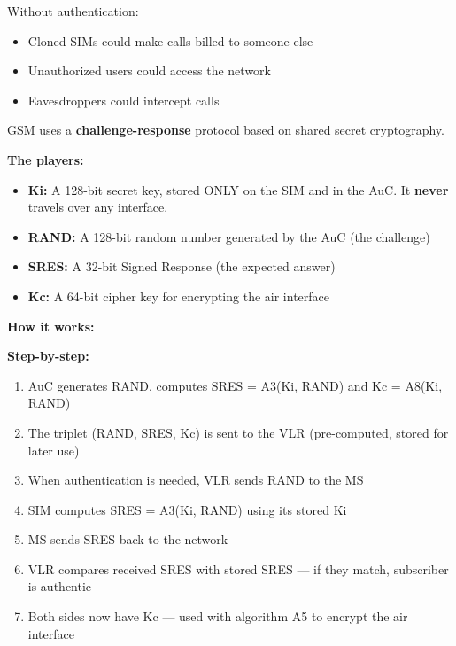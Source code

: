 Without authentication:

\begin{itemize}
\tightlist
\item
  Cloned SIMs could make calls billed to someone else
\item
  Unauthorized users could access the network
\item
  Eavesdroppers could intercept calls
\end{itemize}


GSM uses a \textbf{challenge-response} protocol based on shared secret cryptography.

\textbf{The players:}

\begin{itemize}
\tightlist
\item
  \textbf{Ki:} A 128-bit secret key, stored ONLY on the SIM and in the AuC. It \textbf{never} travels over any interface.
\item
  \textbf{RAND:} A 128-bit random number generated by the AuC (the challenge)
\item
  \textbf{SRES:} A 32-bit Signed Response (the expected answer)
\item
  \textbf{Kc:} A 64-bit cipher key for encrypting the air interface
\end{itemize}


\textbf{How it works:}


\textbf{Step-by-step:}

\begin{enumerate}
\def\labelenumi{\arabic{enumi}.}
\tightlist
\item
  AuC generates RAND, computes SRES = A3(Ki, RAND) and Kc = A8(Ki, RAND)
\item
  The triplet (RAND, SRES, Kc) is sent to the VLR (pre-computed, stored for later use)
\item
  When authentication is needed, VLR sends RAND to the MS
\item
  SIM computes SRES = A3(Ki, RAND) using its stored Ki
\item
  MS sends SRES back to the network
\item
  VLR compares received SRES with stored SRES — if they match, subscriber is authentic
\item
  Both sides now have Kc — used with algorithm A5 to encrypt the air interface
\end{enumerate}

